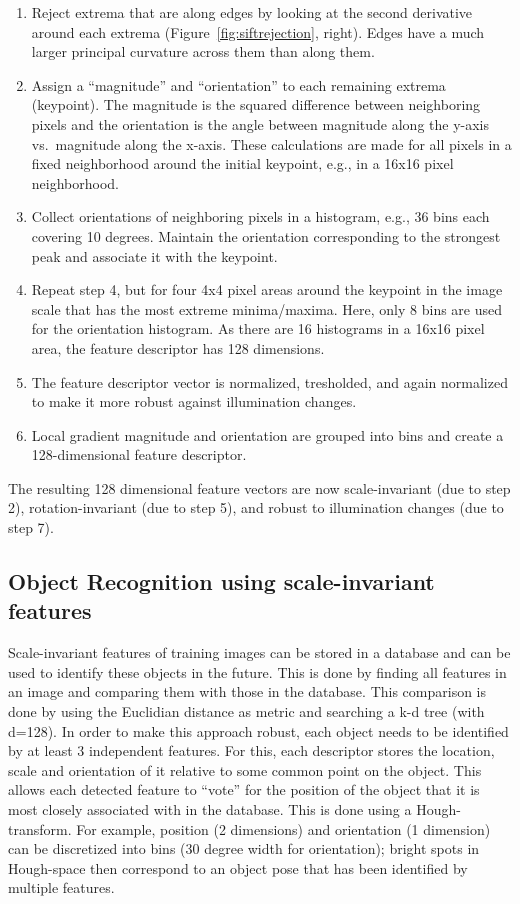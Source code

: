 \begin{enumerate}
\item Reject extrema that are along edges by looking at the second derivative around each extrema (Figure~\ref{fig:siftrejection}, right). Edges have a much larger principal curvature across them than along them.
\item Assign a ``magnitude'' and ``orientation'' to each remaining extrema (keypoint). The magnitude is the squared difference between neighboring pixels and the orientation is the angle between magnitude along the y-axis vs.\ magnitude along the x-axis. These calculations are made for all pixels in a fixed neighborhood around the initial keypoint, e.g., in a 16x16 pixel neighborhood.
\item Collect orientations of neighboring pixels in a histogram, e.g., 36 bins each covering 10 degrees. Maintain the orientation corresponding to the strongest peak and associate it with the keypoint.
\item Repeat step 4, but for four 4x4 pixel areas around the keypoint in the image scale that has the most extreme minima/maxima. Here, only 8 bins are used for the orientation histogram. As there are 16 histograms in a 16x16 pixel area, the feature descriptor has 128 dimensions.
\item The feature descriptor vector is normalized, tresholded, and again normalized to make it more robust against illumination changes.
\item Local gradient magnitude and orientation are grouped into bins and create a 128-dimensional feature descriptor.
\end{enumerate}

The resulting 128 dimensional feature vectors are now scale-invariant (due to step 2), rotation-invariant (due to step 5), and robust to illumination changes (due to step 7).

\subsection{Object Recognition using scale-invariant features}
Scale-invariant features of training images can be stored in a database and can be used to identify these objects in the future. This is done by finding all features in an image and comparing them with those in the database. This comparison is done by using the Euclidian distance as metric and searching a k-d tree (with d=128). In order to make this approach robust, each object needs to be identified by at least 3 independent features. For this, each descriptor stores the location, scale and orientation of it relative to some common point on the object. This allows each detected feature to ``vote'' for the position of the object that it is most closely associated with in the database.  This is done using a Hough-transform. For example, position (2 dimensions) and orientation (1 dimension) can be discretized into bins (30 degree width for orientation); bright spots in Hough-space then correspond to an object pose that has been identified by multiple features.

